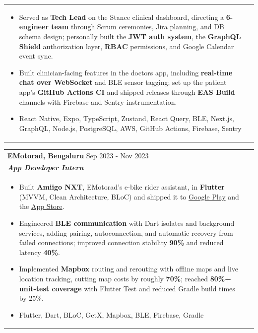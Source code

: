 \documentclass[a4paper,8pt]{article}
\begin{document}
\begin{tabularx}{\linewidth}{ @{}l r@{} }
\begin{minipage}[t]{\linewidth}
\begin{itemize}[nosep,after=\strut, leftmargin=2em, itemsep=2pt]
        \item Served as \textbf{Tech Lead} on the Stance clinical dashboard, directing a \textbf{6-engineer team} through Scrum ceremonies, Jira planning, and DB schema design; personally built the \textbf{JWT auth system}, the \textbf{GraphQL Shield} authorization layer, \textbf{RBAC} permissions, and Google Calendar event sync.
        \item Built clinician-facing features in the doctors app, including \textbf{real-time chat over WebSocket} and BLE sensor tagging; set up the patient app's \textbf{GitHub Actions CI} and shipped releases through \textbf{EAS Build} channels with Firebase and Sentry instrumentation.
        \item React Native, Expo, TypeScript, Zustand, React Query, BLE, Next.js, GraphQL, Node.js, PostgreSQL, AWS, GitHub Actions, Firebase, Sentry
    \end{itemize}
\end{minipage}
\end{tabularx}

\begin{tabularx}{\linewidth}{ @{}l r@{} }
\color[HTML]{1C033C} \textbf{EMotorad, Bengaluru} \hfill \color[HTML]{371e77} Sep 2023 - Nov 2023 \\[4pt]
\color[HTML]{371e77}\textbf{\textit{App Developer Intern}} \hfill \color[HTML]{4B28A4} \\[5pt]
\begin{minipage}[t]{\linewidth}
    \begin{itemize}[nosep,after=\strut, leftmargin=2em, itemsep=2pt]
        \item Built \textbf{Amiigo NXT}, EMotorad's e-bike rider assistant, in \textbf{Flutter} (MVVM, Clean Architecture, BLoC) and shipped it to \href{https://play.google.com/store/apps/details?id=com.emotorad.amigonxt}{Google Play} and the \href{https://apps.apple.com/in/app/amiigo-nxt/id6737222680}{App Store}.
        \item Engineered \textbf{BLE communication} with Dart isolates and background services, adding pairing, autoconnection, and automatic recovery from failed connections; improved connection stability \textbf{90\%} and reduced latency \textbf{40\%}.
        \item Implemented \textbf{Mapbox} routing and rerouting with offline maps and live location tracking, cutting map costs by roughly \textbf{70\%}; reached \textbf{80\%+ unit-test coverage} with Flutter Test and reduced Gradle build times by 25\%.
        \item Flutter, Dart, BLoC, GetX, Mapbox, BLE, Firebase, Gradle
    \end{itemize}
    \end{minipage}
\end{tabularx}
\end{document}
